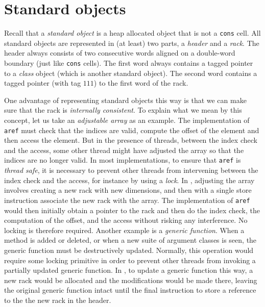 \section{Standard objects}
\label{sec-data-representation-standard-object}

Recall that a \emph{standard object} is a heap allocated object that
is not a \texttt{cons} cell.  All standard objects are represented in
(at least) two parts, a \emph{header} and a \emph{rack}.  The
header always consists of two consecutive words aligned on a
double-word boundary (just like \texttt{cons} cells).  The first word
always contains a tagged pointer to a \emph{class} object (which is
another standard object).  The second word contains a tagged pointer
(with tag $111$) to the first word of the rack.

One advantage of representing standard objects this way is that we can
make sure that the rack is \emph{internally consistent}.  To explain
what we mean by this concept, let us take an \emph{adjustable array}
as an example.  The implementation of \texttt{aref} must check that
the indices are valid, compute the offset of the element and then
access the element.  But in the presence of threads, between the index
check and the access, some other thread might have adjusted the array
so that the indices are no longer valid.  In most implementations, to
ensure that \texttt{aref} is \emph{thread safe}, it is necessary to
prevent other threads from intervening between the index check and the
access, for instance by using a \emph{lock}.  In \sysname{}, adjusting
the array involves creating a new rack with new dimensions, and then
with a single store instruction associate the new rack with the array.
The implementation of \texttt{aref} would then initially obtain a
pointer to the rack and then do the index check, the computation of
the offset, and the access without risking any interference.  No
locking is therefore required.  Another example is a \emph{generic
  function}.  When a method is added or deleted, or when a new suite
of argument classes is seen, the generic function must be
destructively updated.  Normally, this operation would require some
locking primitive in order to prevent other threads from invoking a
partially updated generic function.  In \sysname{}, to update a
generic function this way, a new rack would be allocated and the
modifications would be made there, leaving the original generic
function intact until the final instruction to store a reference to
the the new rack in the header.

